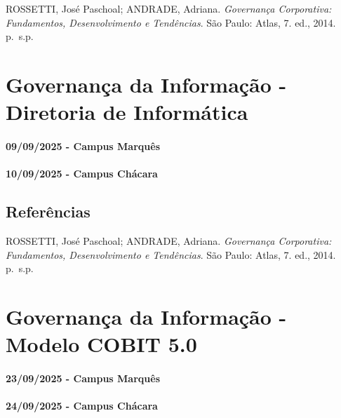 \documentclass[
]{book}
\begin{document}
ROSSETTI, José Paschoal; ANDRADE, Adriana. \emph{Governança Corporativa: Fundamentos, Desenvolvimento e Tendências}. São Paulo: Atlas, 7. ed., 2014. p.~s.p.

\chapter{Governança da Informação - Diretoria de Informática}\label{governanuxe7a-da-informauxe7uxe3o---diretoria-de-informuxe1tica}

\subsubsection*{09/09/2025 - Campus Marquês}\label{campus-marquuxeas-5}

\subsubsection*{10/09/2025 - Campus Chácara}\label{campus-chuxe1cara-5}

\section{Referências}\label{referuxeancias-4}

ROSSETTI, José Paschoal; ANDRADE, Adriana. \emph{Governança Corporativa: Fundamentos, Desenvolvimento e Tendências}. São Paulo: Atlas, 7. ed., 2014. p.~s.p.

\chapter{Governança da Informação - Modelo COBIT 5.0}\label{governanuxe7a-da-informauxe7uxe3o---modelo-cobit-5.0}

\subsubsection*{23/09/2025 - Campus Marquês}\label{campus-marquuxeas-6}

\subsubsection*{24/09/2025 - Campus Chácara}\label{campus-chuxe1cara-6}
\end{document}
